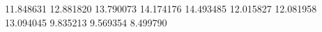 11.848631
12.881820
13.790073
14.174176
14.493485
12.015827
12.081958
13.094045
9.835213
9.569354
8.499790
